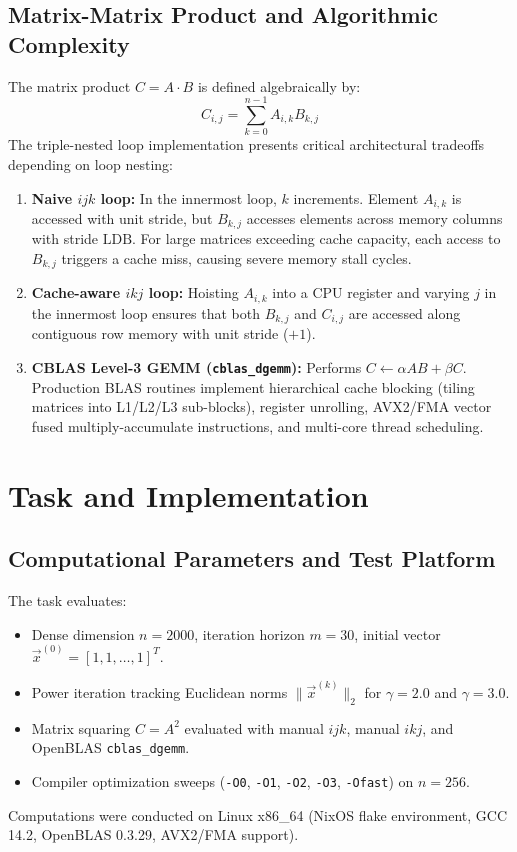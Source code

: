 \documentclass[11pt,a4paper]{article}
\begin{document}
\subsection{Matrix-Matrix Product and Algorithmic Complexity}
The matrix product $C = A \cdot B$ is defined algebraically by:
\begin{equation}
C_{i,j} = \sum_{k=0}^{n-1} A_{i,k} B_{k,j}
\end{equation}
The triple-nested loop implementation presents critical architectural tradeoffs depending on loop nesting:
\begin{enumerate}
    \item \textbf{Naive $ijk$ loop:} In the innermost loop, $k$ increments. Element $A_{i,k}$ is accessed with unit stride, but $B_{k,j}$ accesses elements across memory columns with stride $\text{LDB}$. For large matrices exceeding cache capacity, each access to $B_{k,j}$ triggers a cache miss, causing severe memory stall cycles.
    \item \textbf{Cache-aware $ikj$ loop:} Hoisting $A_{i,k}$ into a CPU register and varying $j$ in the innermost loop ensures that both $B_{k,j}$ and $C_{i,j}$ are accessed along contiguous row memory with unit stride ($+1$).
    \item \textbf{CBLAS Level-3 GEMM (\texttt{cblas\_dgemm}):} Performs $C \leftarrow \alpha A B + \beta C$. Production BLAS routines implement hierarchical cache blocking (tiling matrices into L1/L2/L3 sub-blocks), register unrolling, AVX2/FMA vector fused multiply-accumulate instructions, and multi-core thread scheduling.
\end{enumerate}

\section{Task and Implementation}

\subsection{Computational Parameters and Test Platform}
The task evaluates:
\begin{itemize}
    \item Dense dimension $n = 2000$, iteration horizon $m = 30$, initial vector $\vec{x}^{(0)} = [1, 1, \dots, 1]^T$.
    \item Power iteration tracking Euclidean norms $\|\vec{x}^{(k)}\|_2$ for $\gamma = 2.0$ and $\gamma = 3.0$.
    \item Matrix squaring $C = A^2$ evaluated with manual $ijk$, manual $ikj$, and OpenBLAS \texttt{cblas\_dgemm}.
    \item Compiler optimization sweeps (\texttt{-O0}, \texttt{-O1}, \texttt{-O2}, \texttt{-O3}, \texttt{-Ofast}) on $n = 256$.
\end{itemize}
Computations were conducted on Linux x86\_64 (NixOS flake environment, GCC 14.2, OpenBLAS 0.3.29, AVX2/FMA support).
\end{document}

